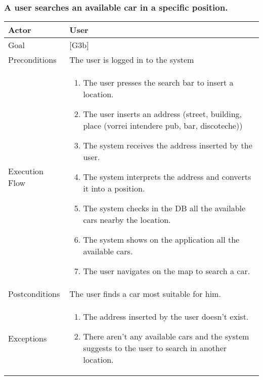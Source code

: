 \documentclass[english]{article}
\begin{document}
	\subsubsection{A user searches an available car in a specific position.}
	\begin{tabularx}{\textwidth}{  l  X  }
		\hline
		Actor & User\\
		\hline
		Goal & [G3b]\\
		\hline
		Preconditions & The user is logged in to the system\\
		\hline
		Execution Flow & \begin{enumerate}
			\item{The user presses the search bar to insert a location.}
			\item{The user inserts an address (street, building, place (vorrei intendere pub, bar, discoteche))}
			\item{The system receives the address inserted by the user.}
			\item{The system interprets the address and converts it into a position.}
			\item{The system checks in the DB all the available cars nearby the location.}
			\item{The system shows on the application all the available cars.}
			\item{The user navigates on the map to search a car.}
		\end{enumerate}\\
		\hline
		Postconditions & The user finds a car most suitable for him.\\
		\hline
		Exceptions & \begin{enumerate}
			\item{The address inserted by the user doesn't exist.}
			\item{There aren't any available cars and the system suggests to the user to search in another location.}
		\end{enumerate}\\
		\hline
	\end{tabularx}
	
\end{document}
